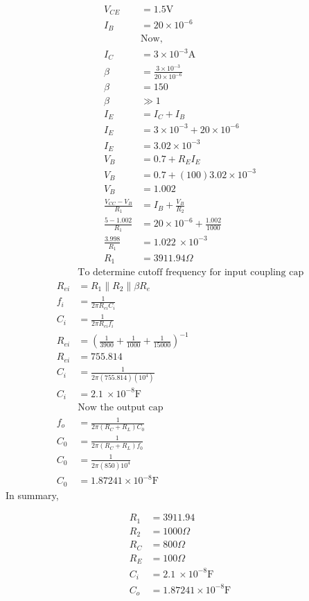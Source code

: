 \documentclass{article}
\begin{document}
\begin{align*}
V_{CE} & =1.5\text{V}\\
I_{B} & =20\times 10^{-6}\\
 & \text{Now,}\\
I_{C} & =3\times 10^{-3}\text{A}\\
\beta  & =\frac{3\times 10^{-3}}{20\times 10^{-6}}\\
\beta  & =150\\
\beta  & \gg 1\\
I_{E} & =I_{C} +I_{B}\\
I_{E} & =3\times 10^{-3} +20\times 10^{-6}\\
I_{E} & =3.02\times 10^{-3}\\
V_{B} & =0.7+R_{E} I_{E}\\
V_{B} & =0.7+( 100) 3.02\times 10^{-3}\\
V_{B} & =1.002\\
\frac{V_{CC} -V_{B}}{R_{1}} & =I_{B} +\frac{V_{B}}{R_{2}}\\
\frac{5-1.002}{R_{1}} & =20\times 10^{-6} +\frac{1.002}{1000}\\
\frac{3.998}{R_{1}} & =1.022\ \times 10^{-3}\\
R_{1} & =3911.94\Omega 
\end{align*}
\begin{align*}
 & \text{To determine cutoff frequency for 
input coupling cap}\\
R_{ei} & =R_{1} \parallel R_{2} \parallel \beta R_{e}\\
f_{i} & =\frac{1}{2\pi R_{ei} C_{i}}\\
C_{i} & =\frac{1}{2\pi R_{ei} f_{i}}\\
R_{ei} & =\left(\frac{1}{3900} +\frac{1}{1000} +\frac{1}{15000}\right)^{-1}\\
R_{ei} & =755.814\\
C_{i} & =\frac{1}{2\pi ( 755.814)\left( 10^{4}\right)}\\
C_{i} & =2.1\ \times 10^{-8}\text{F}\\
 & \text{Now the output cap}\\
f_{o} & =\frac{1}{2\pi ( R_{C} +R_{L}) C_{0}}\\
C_{0} & =\frac{1}{2\pi ( R_{C} +R_{L}) f_{0}}\\
C_{0} & =\frac{1}{2\pi ( 850) 10^{4}}\\
C_{0} & =1.87241\times 10^{-8}\text{F}
\end{align*}
In summary,


\begin{align*}
R_{1} & =3911.94\\
R_{2} & =1000\Omega \\
R_{C} & =800\Omega \\
R_{E} & =100\Omega \\
C_{i} & =2.1\ \times 10^{-8}\text{F}\\
C_{o} & =1.87241\times 10^{-8}\text{F}
\end{align*}
\end{document}
